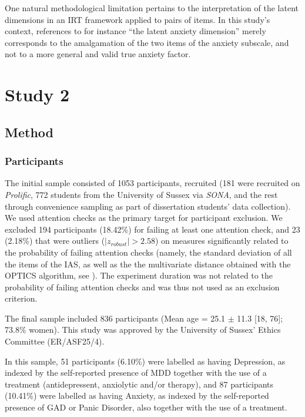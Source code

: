 \documentclass[
  man,
  floatsintext,
  longtable,
  nolmodern,
  notxfonts,
  notimes,
  colorlinks=true,linkcolor=blue,citecolor=blue,urlcolor=blue]{apa7}
\begin{document}
One natural methodological limitation pertains to the interpretation of
the latent dimensions in an IRT framework applied to pairs of items. In
this study's context, references to for instance ``the latent anxiety
dimension'' merely corresponds to the amalgamation of the two items of
the anxiety subscale, and not to a more general and valid true anxiety
factor.

\section{Study 2}\label{study-2}

\subsection{Method}\label{method-1}

\subsubsection{Participants}\label{participants-1}

The initial sample consisted of 1053 participants, recruited (181 were
recruited on \emph{Prolific}, 772 students from the University of Sussex
via \emph{SONA}, and the rest through convenience sampling as part of
dissertation students' data collection). We used attention checks as the
primary target for participant exclusion. We excluded 194 participants
(18.42\%) for failing at least one attention check, and 23 (2.18\%) that
were outliers (\(|z_{robust}| > 2.58\)) on measures significantly
related to the probability of failing attention checks (namely, the
standard deviation of all the items of the IAS, as well as the the
multivariate distance obtained with the OPTICS algorithm, see
). The
experiment duration was not related to the probability of failing
attention checks and was thus not used as an exclusion criterion.

The final sample included 836 participants (Mean age = 25.1 \(\pm\) 11.3
{[}18, 76{]}; 73.8\% women). This study was approved by the University
of Sussex' Ethics Committee (ER/ASF25/4).

In this sample, 51 participants (6.10\%) were labelled as having
Depression, as indexed by the self-reported presence of MDD together
with the use of a treatment (antidepressent, anxiolytic and/or therapy),
and 87 participants (10.41\%) were labelled as having Anxiety, as
indexed by the self-reported presence of GAD or Panic Disorder, also
together with the use of a treatment.
\end{document}
